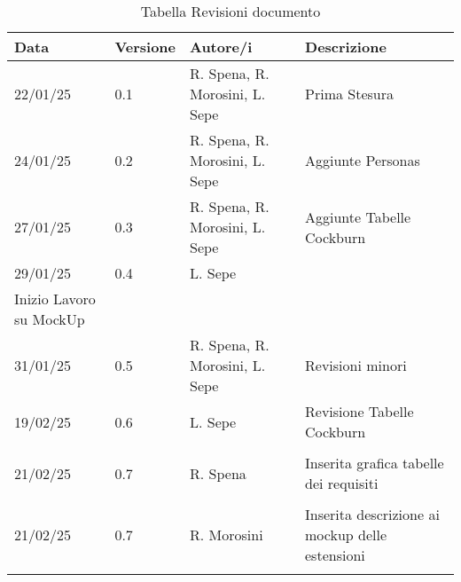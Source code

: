 \begin{longtable}{|l|l|l|l|}
\caption{Tabella Revisioni documento }
\label{tab:my-table}\\
\hline
\rowcolor[HTML]{10b981} 
{\color[HTML]{FFFFFF} Data} & {\color[HTML]{FFFFFF} Versione} & {\color[HTML]{FFFFFF} Autore/i} & {\color[HTML]{FFFFFF} Descrizione} \\ \hline
\endhead
%
22/01/25                    & 0.1                             & R. Spena, R. Morosini, L. Sepe  &  Prima Stesura                      \\ \hline
\rowcolor[HTML]{ecfdf5} 
  24/01/25                  & 0.2                             & R. Spena, R. Morosini, L. Sepe  & Aggiunte Personas        \\ \hline
   27/01/25                 & 0.3                             & R. Spena, R. Morosini, L. Sepe  & Aggiunte Tabelle Cockburn\\ \hline
\rowcolor[HTML]{ecfdf5} 
  29/01/25                  &  0.4                            & L. Sepe                         &\begin{tabular}{c}
        Completate Tabelle Cockburn \\
        Inizio Lavoro su MockUp
  \end{tabular}         \\ \hline
    31/01/25                & 0.5                             & R. Spena, R. Morosini, L. Sepe  &    Revisioni minori                          \\ \hline
\rowcolor[HTML]{ecfdf5} 
   19/02/25                 &    0.6                          &    L. Sepe                     &  Revisione Tabelle Cockburn                           \\ \hline
                            &                                 &                                 &                                    \\ \hline
\rowcolor[HTML]{ecfdf5} 
    21/02/25                           & 0.7                                &   R. Spena                              &   Inserita grafica tabelle dei requisiti                                 \\ \hline
                            &                                 &                                 &                                    \\ \hline
\rowcolor[HTML]{ecfdf5} 
    21/02/25                           & 0.7                                &   R. Morosini                              &   Inserita descrizione ai mockup delle estensioni                                 \\ \hline
                            &                                 &                                 &                                    \\ \hline
                            

\end{longtable}